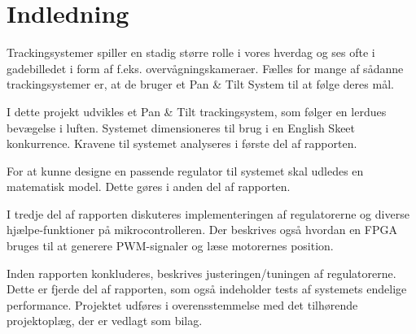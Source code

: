 \section*{Indledning}
Trackingsystemer spiller en stadig større rolle i vores hverdag og ses ofte i gadebilledet i form 
af f.eks. overvågningskameraer.
Fælles for mange af sådanne trackingsystemer er, at de bruger et Pan \& Tilt System til at følge deres mål. 

I dette projekt udvikles et Pan \& Tilt trackingsystem, som følger en lerdues bevægelse i 
luften. Systemet dimensioneres til brug i en English Skeet konkurrence. Kravene til systemet analyseres i første del af rapporten. 

For at kunne designe en passende regulator til systemet skal udledes en matematisk model. Dette gøres i anden del af rapporten. 

I tredje del af rapporten diskuteres implementeringen af regulatorerne og diverse hjælpe-funktioner på mikrocontrolleren. Der beskrives også hvordan en FPGA bruges til at generere PWM-signaler og læse motorernes position. 

Inden rapporten konkluderes, beskrives justeringen/tuningen af regulatorerne. Dette er fjerde del af rapporten, som også indeholder tests af systemets endelige performance. 
Projektet udføres i overensstemmelse med det tilhørende projektoplæg, der er vedlagt 
som bilag.

